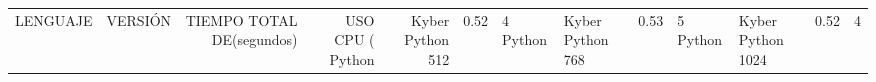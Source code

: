 \begin{tabular}{llrrr}
\toprule
LENGUAJE &           VERSIÓN & TIEMPO TOTAL DE (segundos) & USO CPU (%
\midrule
  Python &  Kyber Python 512 &                                  0.52 &          4%
  Python &  Kyber Python 768 &                                  0.53 &          5%
  Python & Kyber Python 1024 &                                  0.52 &          4%
\bottomrule
\end{tabular}
